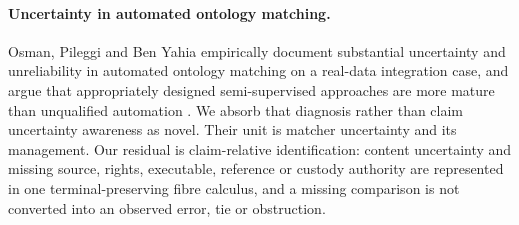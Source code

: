 \paragraph{Uncertainty in automated ontology matching.}
Osman, Pileggi and Ben Yahia empirically document substantial uncertainty and
unreliability in automated ontology matching on a real-data integration case,
and argue that appropriately designed semi-supervised approaches are more
mature than unqualified automation \cite{osman2024uncertainty}. We absorb that
diagnosis rather than claim uncertainty awareness as novel. Their unit is
matcher uncertainty and its management. Our residual is claim-relative
identification: content uncertainty and missing source, rights, executable,
reference or custody authority are represented in one terminal-preserving
fibre calculus, and a missing comparison is not converted into an observed
error, tie or obstruction.

